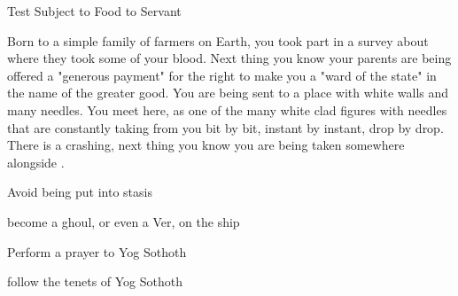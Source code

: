\documentclass[char]{guildcamp4}
\begin{document}
\name{\cPlead{}}

Test Subject to Food to Servant

Born to a simple family of farmers on Earth, you took part in a survey about where they took some of your blood. Next thing you know your parents 
are being offered a "generous payment" for the right to make you a "ward of the state" in the name of the greater good. You are being sent to a place with white walls and many needles. You meet \cSpite{}  here, as one of the many white clad figures with needles that are constantly taking from you bit by bit, instant by instant, drop by drop. There is a crashing, next thing you know you are being taken somewhere alongside \cSpite{}.


\begin{itemz}[Goals]
	\item Avoid being put into stasis
	\item become a ghoul, or even a Ver, on the ship
	\item Perform a prayer to Yog Sothoth
	\item follow the tenets of Yog Sothoth
\end{itemz}

\begin{itemz}[Notes]
	\item 
\end{itemz}

\end{document}
